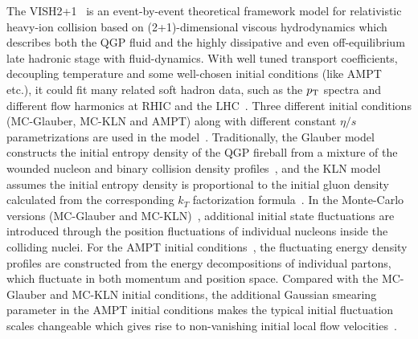 \documentclass[ALICE,manyauthors]{cernphprep}
\begin{document}
The VISH2+1~\cite{Shen:2010uy} is an event-by-event theoretical framework model for relativistic heavy-ion collision based on (2+1)-dimensional viscous hydrodynamics which describes both the QGP fluid and the highly dissipative and even off-equilibrium late hadronic stage with fluid-dynamics. With well tuned transport coefficients, decoupling temperature  and some well-chosen initial conditions (like {AMPT}~\cite{Xu:2016hmp,Bhalerao:2015iya,Pang:2012he} etc.), it could fit many related soft hadron data, such as the $p_{\rm T}$ spectra and different flow harmonics at RHIC and the LHC~\cite{Qiu:2011hf, Shen:2010uy, Shen:2011eg, Bhalerao:2015iya}.
Three different initial conditions ({MC-Glauber}, {MC-KLN} and {AMPT}) along with different constant $\eta/s$ parametrizations are used in the model~\cite{Zhu:2016puf}. 
Traditionally, the Glauber model constructs the initial entropy density of the QGP fireball from a mixture of the wounded nucleon and binary collision density profiles~\cite{Kolb:2000sd}, and the {KLN} model assumes the initial entropy density is proportional to the initial gluon density calculated from the corresponding $k_T$ factorization formula~\cite{Kharzeev:2000ph}. In the Monte-Carlo versions ({MC-Glauber} and {MC-KLN})~\cite{Miller:2007ri,Drescher:2006ca,Hirano:2009ah}, additional initial state fluctuations are introduced through the position fluctuations of individual nucleons inside the colliding nuclei. For the {AMPT} initial conditions~\cite{Bhalerao:2015iya,Pang:2012he,Xu:2016hmp}, the fluctuating energy density profiles are constructed from the energy decompositions of individual partons, which fluctuate in both momentum and position space. Compared with the {MC-Glauber} and {MC-KLN} initial conditions, the additional Gaussian smearing parameter in the {AMPT} initial conditions makes the typical initial fluctuation scales changeable which gives rise to non-vanishing initial local flow velocities~\cite{Pang:2012he}.
\end{document}
